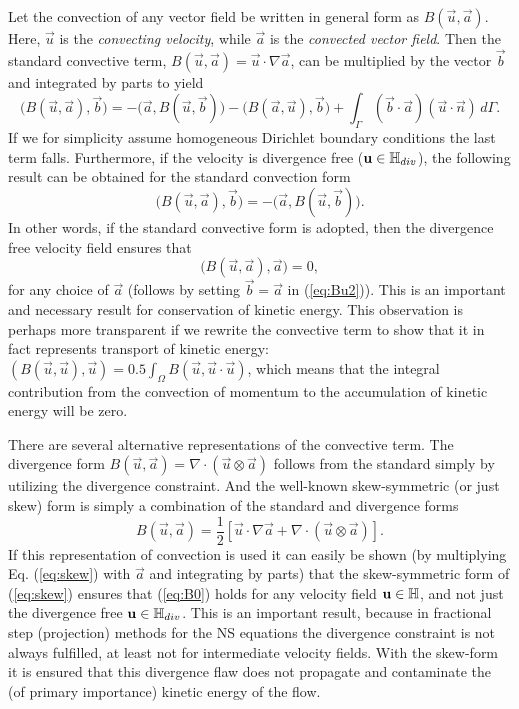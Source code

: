 Let the convection of any vector field be written in general form as $B(\vec{u},\vec{a})$. Here, $\vec{u}$ is the \emph{convecting velocity}, while $\vec{a}$ is the \emph{convected vector field}. Then the standard convective term, $B(\vec{u},\vec{a}) = \vec{u}\cdot \nabla \vec{a} $, can be multiplied by the vector $\vec{b}$ and integrated by parts to yield
\begin{equation}
 \bigl( B(\vec{u}, \vec{a}), \vec{b}\bigr) = -\bigl( \vec{a}, B(\vec{u},\vec{b})\bigr) - \bigl( B (\vec{a}, \vec{u}), \vec{b} \bigr) + \int_{\Gamma} \left(\vec{b} \cdot \vec{a} \right)\left(\vec{u} \cdot \vec{n} \right) \, d\Gamma.
\label{eq:Bu1}
\end{equation}
If we for simplicity assume homogeneous Dirichlet boundary conditions the last term falls. Furthermore, if the velocity is divergence free ($\mathbf{ u }\in \mathbb{H}_{div}$), the following result can be obtained for the standard convection form
\begin{equation}
\bigl( B(\vec{u},\vec{a}), \vec{b} \bigr) = -\bigl( \vec{a}, B(\vec{u},\vec{b}) \bigr).
\label{eq:Bu2}
\end{equation}
In other words, if the standard convective form is adopted, then the divergence free velocity field ensures that
\begin{equation} 
\bigl( B(\vec{u}, \vec{a}), \vec{a} \bigr) = 0,
\label{eq:B0}
\end{equation}
for any choice of $\vec{a}$ (follows by setting $\vec{b}=\vec{a}$ in
(\ref{eq:Bu2})). This is an important and necessary result for
conservation of kinetic energy. This observation is perhaps more
transparent if we rewrite the convective term to show that it in fact
represents transport of kinetic energy:
$\left(B(\vec{u}, \vec{u}), \vec{u} \right) = 0.5 \int_{\Omega}
B(\vec{u},\vec{u}\cdot \vec{u})$, which means that the integral
contribution from the convection of momentum to the accumulation of
kinetic energy will be zero.

There are several alternative representations of the convective term. The divergence form $B(\vec{u},\vec{a})=\nabla \cdot (\vec{u} \otimes \vec{a})$ follows from the standard simply by utilizing the divergence constraint. And the well-known skew-symmetric (or just skew) form is simply a combination of the standard and divergence forms
\begin{equation}
 B(\vec{u},\vec{a}) = \frac{1}{2}\left[ \vec{u}\cdot \nabla \vec{a} + \nabla \cdot (\vec{u} \otimes \vec{a}) \right].
\label{eq:skew}
\end{equation}
If this representation of convection is used it can easily be shown (by multiplying Eq. (\ref{eq:skew}) with $\vec{a}$ and integrating by parts) that the skew-symmetric form of (\ref{eq:skew}) ensures that (\ref{eq:B0}) holds for any velocity field $\mathbf{ u } \in \mathbb{H}$, and not just the divergence free $\mathbf{ u } \in \mathbb{H}_{div}$. This is an important result, because in fractional step (projection) methods for the NS equations the divergence constraint is not always fulfilled, at least not for intermediate velocity fields. With the skew-form it is ensured that this divergence flaw does not propagate and contaminate the (of primary importance) kinetic energy of the flow.

